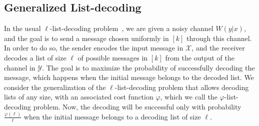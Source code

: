 \subsection{Generalized List-decoding}
\label{subsection:generalized-list-decoding}

In the usual $\ell$-list-decoding problem~\cite{Elias57,Wozencraft58}, we are given a noisy channel $W(y|x)$, and the goal is to send a message chosen uniformly in $[k]$ through this channel. In order to do so, the sender encodes the input message in $\mathcal{X}$, and the receiver decodes a list of size $\ell$ of possible messages in $[k]$ from the output of the channel in $\mathcal{Y}$. The goal is to maximize the probability of successfully decoding the message, which happens when the initial message belongs to the decoded list. We consider the generalization of the $\ell$-list-decoding problem that allows decoding lists of any size, with an associated cost function $\varphi$, which we call the $\varphi$-list-decoding problem. Now, the decoding will be successful only with probability $\frac{\varphi(\ell)}{\ell}$ when the initial message belongs to a decoding list of size $\ell$. 

